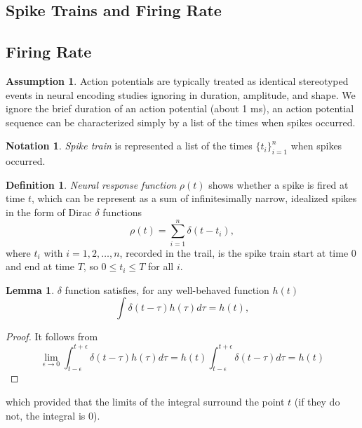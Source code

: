 \documentclass[letterpaper,oneside]{book}
\numberwithin{equation}{chapter}
\theoremstyle{definition}
\newtheorem{asm}[thm]{Assumption}
\newtheorem{defn}[thm]{Definition}
\newtheorem{lem}[thm]{Lemma}
\newtheorem{ntn}{Notation}
\begin{document}
\begin{multicols}{2} 
\setlength{\columnseprule}{0.2pt}  

\section{Spike Trains and Firing Rate}
\label{sec:firing rate}

\subsection{Firing Rate}

\begin{asm}
  Action potentials are typically treated as identical 
  stereotyped events in neural encoding
  studies ignoring in duration, amplitude, and shape. 
  We ignore the brief duration of an action potential (about 1 ms),
  an action potential sequence can be characterized simply by a list of the
  times when spikes occurred.
\end{asm} 

\begin{ntn}
  \emph{Spike train} is represented a list of the times $\{t_i\}_{i=1}^n$ when spikes occurred.
\end{ntn}

\begin{defn}
  \emph{Neural response function} $\rho (t)$ shows whether a spike is fired at time $t$,
   which can be represent as a sum of infinitesimally narrow, 
  idealized spikes in the form of Dirac $\delta$ functions
  \begin{equation}
    \label{equ:1.1}
    \rho(t)=\sum_{i=1}^n\delta(t-t_i),
  \end{equation}
  where $t_i$ with $i=1,2,\dots,n$, recorded in the trail, is the spike train
   start at time $0$ and end at time $T$, so $0\leq t_i\leq T$ for all $i$.
\end{defn}

\begin{lem}
  $\delta$ function satisfies, for any well-behaved function $h(t)$
  \begin{equation}
    \label{equ:1.3}
    \int \delta(t-\tau)h(\tau)d\tau=h(t),
  \end{equation}
  \begin{proof}
  It follows from
  \begin{equation*}
    \lim_{\epsilon\rightarrow 0}\int_{t - \epsilon}^{t + \epsilon} \delta(t-\tau)h(\tau)d\tau
    =h(t)\int_{t - \epsilon}^{t + \epsilon} \delta(t-\tau)d\tau=h(t)
  \end{equation*}
  \end{proof}
which provided that the limits of the integral surround the point $t$ (if they do not,
  the integral is $0$).
\end{lem}


\end{multicols}
\end{document}
